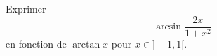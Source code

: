 Exprimer 
\begin{displaymath}
 \arcsin \frac{2x}{1 + x^2}
\end{displaymath}
en fonction de $\arctan x$ pour $x\in]-1,1[$.
\bigskip